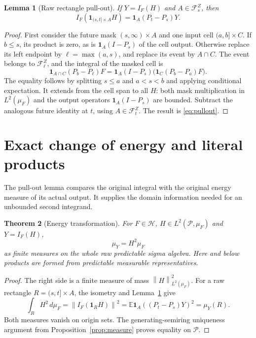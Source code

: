 \documentclass[11pt]{article}
\newtheorem{theorem}{Theorem}[section]
\newtheorem{lemma}[theorem]{Lemma}
\theoremstyle{remark}\newtheorem{remark}[theorem]{Remark}
\newcommand{\E}{\mathbb E}
\newcommand{\one}{\mathbf1}
\newcommand{\norm}[1]{\left\lVert#1\right\rVert}
\newcommand{\HH}{\mathcal H}
\newcommand{\PP}{\mathcal P}
\begin{document}
\begin{lemma}[Raw rectangle pull-out]\label{lem:pullout}
If $Y=I_F(H)$ and $A\in\mathcal F_s^Z$, then
\begin{equation}\label{eq:pullout}
 I_F(\one_{(s,t]\times A}H)=\one_A(P_t-P_s)Y.
\end{equation}
\end{lemma}
\begin{proof}
First consider the future mask $(s,\infty)\times A$ and one input
cell $(a,b]\times C$. If $b\leq s$, its product is zero, as is
$\one_A(I-P_s)$ of the cell output. Otherwise replace its left endpoint
by $\ell=\max(a,s)$, and replace its event by $A\cap C$.
The event belongs to $\mathcal F_\ell^Z$, and the integral of the
masked cell is
\[
 \one_{A\cap C}(P_b-P_\ell)F
 =\one_A(I-P_s)\bigl(\one_C(P_b-P_a)F\bigr).
\]
The equality follows by splitting $s\leq a$ and $a<s<b$ and applying
conditional expectation. It extends from the cell span to all $H$:
both mask multiplication in $L^2(\mu_F)$ and the output operators
$\one_A(I-P_s)$ are bounded. Subtract the analogous future identity
at $t$, using $A\in\mathcal F_t^Z$. The result is
\eqref{eq:pullout}.
\end{proof}

\section{Exact change of energy and literal products}
The pull-out lemma compares the original integral with the original
energy measure of its actual output. It supplies the domain information
needed for an unbounded second integrand.

\begin{theorem}[Energy transformation]\label{thm:change}
For $F\in\HH$, $H\in L^2(\PP,\mu_F)$ and $Y=I_F(H)$,
\begin{equation}\label{eq:change}
 \mu_Y=H^2\mu_F
\end{equation}
as finite measures on the whole raw predictable sigma algebra.
Here and below products are formed from predictable measurable
representatives.
\end{theorem}
\begin{proof}
The right side is a finite measure of mass $\norm H_{L^2(\mu_F)}^2$.
For a raw rectangle $R=(s,t]\times A$, the isometry and
Lemma~\ref{lem:pullout} give
\[
 \int_R H^2\,d\mu_F
 =\norm{I_F(\one_RH)}^2
 =\E\one_A((P_t-P_s)Y)^2
 =\mu_Y(R).
\]
Both measures vanish on origin sets. The generating-semiring uniqueness
argument from Proposition~\ref{prop:measure} proves equality on $\PP$.
\end{proof}
\end{document}
